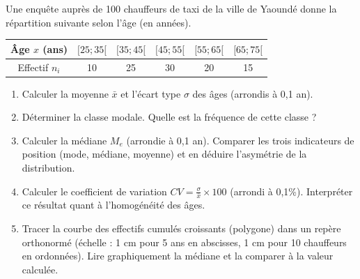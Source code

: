\documentclass[11pt]{article}
\begin{document}
\begin{exercice}
\label{exo:taxi}
Une enquête auprès de 100 chauffeurs de taxi de la ville de Yaoundé donne la répartition suivante selon l'âge (en années).

\begin{center}
\begin{tabular}{|c|c|c|c|c|c|}
\hline
Âge $x$ (ans) & $[25; 35[$ & $[35; 45[$ & $[45; 55[$ & $[55; 65[$ & $[65; 75[$ \\ \hline
Effectif $n_i$ & 10 & 25 & 30 & 20 & 15 \\ \hline
\end{tabular}
\end{center}

\begin{enumerate}
    \item Calculer la moyenne $\bar{x}$ et l'écart type $\sigma$ des âges (arrondis à 0,1 an).
    \item Déterminer la classe modale. Quelle est la fréquence de cette classe ?
    \item Calculer la médiane $M_e$ (arrondie à 0,1 an). Comparer les trois indicateurs de position (mode, médiane, moyenne) et en déduire l'asymétrie de la distribution.
    \item Calculer le coefficient de variation $CV = \frac{\sigma}{\bar{x}} \times 100$ (arrondi à 0,1\%). Interpréter ce résultat quant à l'homogénéité des âges.
    \item Tracer la courbe des effectifs cumulés croissants (polygone) dans un repère orthonormé (échelle : 1 cm pour 5 ans en abscisses, 1 cm pour 10 chauffeurs en ordonnées). Lire graphiquement la médiane et la comparer à la valeur calculée.
\end{enumerate}
\end{exercice}
\end{document}
